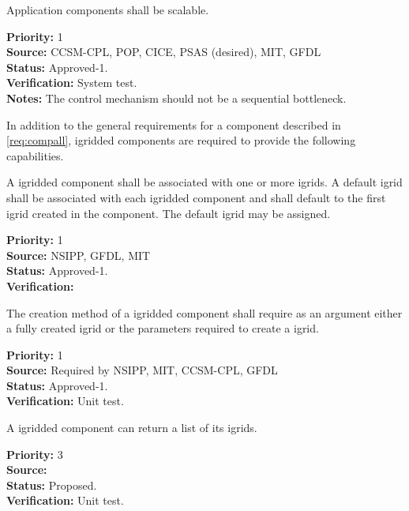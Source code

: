 Application components shall be scalable.

\begin{reqlist}
{\bf Priority:} 1 \\ 
{\bf Source:}  CCSM-CPL, POP, CICE, PSAS (desired), MIT, GFDL \\
{\bf Status:} Approved-1. \\
{\bf Verification:} System test.\\ 
{\bf Notes:}  The control mechanism should not be a sequential bottleneck.
\end{reqlist}


In addition to the general requirements for  a component described in 
\ref{req:compall}, igridded components are required to provide the
following capabilities.

A igridded component shall be associated with one or more igrids.
A default igrid shall be associated with 
each igridded component and shall default to the first igrid created 
in the component.  The default igrid may be assigned.
\begin{reqlist}
{\bf Priority:} 1\\
{\bf Source:} NSIPP, GFDL, MIT \\
{\bf Status:} Approved-1.\\
{\bf Verification:} 
\end{reqlist}

The creation method of a igridded component shall require as an 
argument either a fully created igrid or the parameters
required to create a igrid.
\begin{reqlist}
{\bf Priority:} 1\\
{\bf Source:} Required by NSIPP, MIT, CCSM-CPL, GFDL \\
{\bf Status:} Approved-1. \\
{\bf Verification:} Unit test.
\end{reqlist}


A igridded component can return a list of its igrids.
\begin{reqlist}
{\bf Priority:} 3\\
{\bf Source:} \\
{\bf Status:} Proposed. \\
{\bf Verification:} Unit test.
\end{reqlist}

